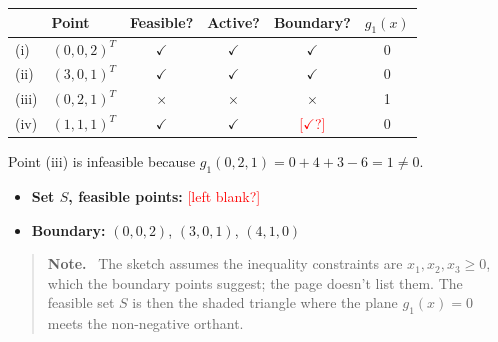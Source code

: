 \documentclass[11pt]{article}
\newcommand{\unclear}[1]{\textcolor{red}{[#1?]}}
\newenvironment{aside}{\begin{quote}\small\color{black!65}\textbf{Note.}\ }{\end{quote}}
\begin{document}
\begin{center}
\begin{tabular}{llcccc}
    \toprule
     & Point & Feasible? & Active? & Boundary? & $g_1(x)$ \\
    \midrule
    (i)   & $(0, 0, 2)^T$ & $\checkmark$ & $\checkmark$ & $\checkmark$ & 0 \\
    (ii)  & $(3, 0, 1)^T$ & $\checkmark$ & $\checkmark$ & $\checkmark$ & 0 \\
    (iii) & $(0, 2, 1)^T$ & $\times$     & $\times$     & $\times$     & 1 \\
    (iv)  & $(1, 1, 1)^T$ & $\checkmark$ & $\checkmark$ & \unclear{$\checkmark$} & 0 \\
    \bottomrule
\end{tabular}
\end{center}

Point (iii) is infeasible because $g_1(0, 2, 1) = 0 + 4 + 3 - 6 = 1 \ne 0$.

\begin{itemize}
    \item \textbf{Set $S$, feasible points:} \unclear{left blank}
    \item \textbf{Boundary:} $(0, 0, 2)$, $(3, 0, 1)$, $(4, 1, 0)$
\end{itemize}

\begin{center}
\end{center}

\begin{aside}
The sketch assumes the inequality constraints are $x_1, x_2, x_3 \ge 0$, which the
boundary points suggest; the page doesn't list them. The feasible set $S$ is then
the shaded triangle where the plane $g_1(x) = 0$ meets the non-negative orthant.
\end{aside}
\end{document}
